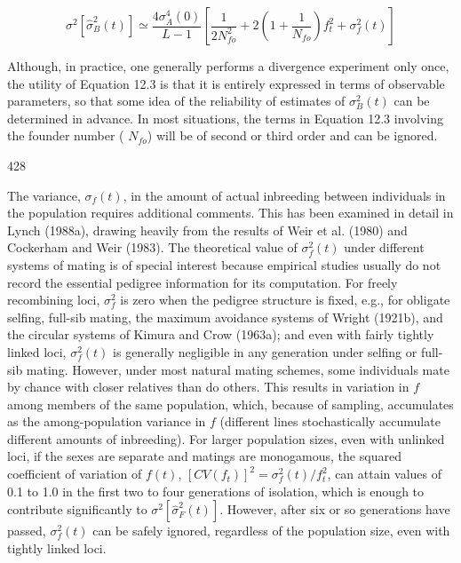 \documentclass{article}
\begin{document}
\begin{equation}
\sigma^{2}[\widehat{\sigma}_{B}^{2}(t)]\simeq\frac{4\sigma_{A}^{4}(0)}{L-1}\left[\frac{1}{2N_{f o}^{2}}+2\left(1+\frac{1}{N_{f o}}\right)f_{t}^{2}+\sigma_{f}^{2}(t)\right]
\tag{12.3}
\label{eq:12_3}
\end{equation}

Although, in practice, one generally performs a divergence experiment only once, the utility of Equation 12.3 is that it is entirely expressed in terms of observable parameters, so that some idea of the reliability of estimates of  $ \sigma_{B}^{2}(t) $ can be determined in advance. In most situations, the terms in Equation 12.3 involving the founder number ( $ N_{fo} $) will be of second or third order and can be ignored.

428

The variance,  $ \sigma_f(t) $, in the amount of actual inbreeding between individuals in the population requires additional comments. This has been examined in detail in Lynch (1988a), drawing heavily from the results of Weir et al. (1980) and Cockerham and Weir (1983). The theoretical value of  $ \sigma_f^2(t) $ under different systems of mating is of special interest because empirical studies usually do not record the essential pedigree information for its computation. For freely recombining loci,  $ \sigma_f^2 $ is zero when the pedigree structure is fixed, e.g., for obligate selfing, full-sib mating, the maximum avoidance systems of Wright (1921b), and the circular systems of Kimura and Crow (1963a); and even with fairly tightly linked loci,  $ \sigma_f^2(t) $ is generally negligible in any generation under selfing or full-sib mating. However, under most natural mating schemes, some individuals mate by chance with closer relatives than do others. This results in variation in  $ f $ among members of the same population, which, because of sampling, accumulates as the among-population variance in  $ f $ (different lines stochastically accumulate different amounts of inbreeding). For larger population sizes, even with unlinked loci, if the sexes are separate and matings are monogamous, the squared coefficient of variation of  $ f(t) $,  $ [CV(f_t)]^2 = \sigma_f^2(t)/f_t^2 $, can attain values of 0.1 to 1.0 in the first two to four generations of isolation, which is enough to contribute significantly to  $ \sigma^2[\widehat{\sigma}_F^2(t)] $. However, after six or so generations have passed,  $ \sigma_f^2(t) $ can be safely ignored, regardless of the population size, even with tightly linked loci.
\end{document}
